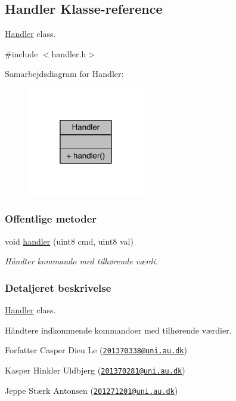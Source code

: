 \hypertarget{class_handler}{}\subsection{Handler Klasse-\/reference}
\label{class_handler}


\hyperlink{class_handler}{Handler} class.  




{\ttfamily \#include $<$handler.\+h$>$}



Samarbejdsdiagram for Handler\+:\nopagebreak
\begin{figure}[H]
\begin{center}
\leavevmode
\includegraphics[width=145pt]{d9/de1/class_handler__coll__graph}
\end{center}
\end{figure}
\subsubsection*{Offentlige metoder}
\begin{DoxyCompactItemize}
\item 
void \hyperlink{class_handler_af5be5b016b862943cd22504490acc8f4}{handler} (uint8 cmd, uint8 val)
\begin{DoxyCompactList}\small\item\em Håndter kommando med tilhørende værdi. \end{DoxyCompactList}\end{DoxyCompactItemize}


\subsubsection{Detaljeret beskrivelse}
\hyperlink{class_handler}{Handler} class. 

Håndtere indkommende kommandoer med tilhørende værdier. \begin{DoxyAuthor}{Forfatter}
Casper Dieu Le (\href{mailto:201370338@uni.au.dk}{\tt 201370338@uni.\+au.\+dk}) 

Kasper Hinkler Uldbjerg (\href{mailto:201370281@uni.au.dk}{\tt 201370281@uni.\+au.\+dk}) 

Jeppe Stærk Antonsen (\href{mailto:201271201@uni.au.dk}{\tt 201271201@uni.\+au.\+dk}) 
\end{DoxyAuthor}



